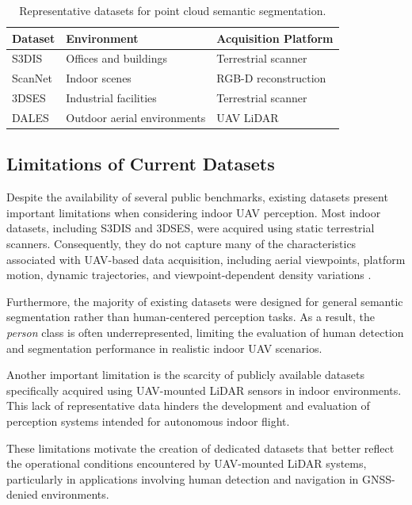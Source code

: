 \begin{table}[htbp]
\centering
\caption{Representative datasets for point cloud semantic segmentation.}
\label{tab:datasets}
\begin{tabular}{|l|l|l|}
\hline
\textbf{Dataset} & \textbf{Environment} & \textbf{Acquisition Platform} \\
\hline
S3DIS \cite{Armeni2016S3DIS} & Offices and buildings & Terrestrial scanner \\
\hline
ScanNet \cite{Dai2017ScanNet} & Indoor scenes & RGB-D reconstruction \\
\hline
3DSES \cite{Merizette2025ThreeDSES} & Industrial facilities & Terrestrial scanner \\
\hline
DALES \cite{Varney2020DALES} & Outdoor aerial environments & UAV LiDAR \\
\hline
\end{tabular}
\end{table}

\subsection{Limitations of Current Datasets}

Despite the availability of several public benchmarks, existing datasets present important limitations when considering indoor UAV perception. Most indoor datasets, including S3DIS and 3DSES, were acquired using static terrestrial scanners. Consequently, they do not capture many of the characteristics associated with UAV-based data acquisition, including aerial viewpoints, platform motion, dynamic trajectories, and viewpoint-dependent density variations \cite{Armeni2016S3DIS,Bournez2024Indoor}.

Furthermore, the majority of existing datasets were designed for general semantic segmentation rather than human-centered perception tasks. As a result, the \textit{person} class is often underrepresented, limiting the evaluation of human detection and segmentation performance in realistic indoor UAV scenarios.

Another important limitation is the scarcity of publicly available datasets specifically acquired using UAV-mounted LiDAR sensors in indoor environments. This lack of representative data hinders the development and evaluation of perception systems intended for autonomous indoor flight.

These limitations motivate the creation of dedicated datasets that better reflect the operational conditions encountered by UAV-mounted LiDAR systems, particularly in applications involving human detection and navigation in GNSS-denied environments.


